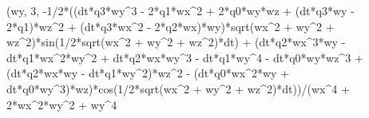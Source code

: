\documentclass[]{article}
\newenvironment{Shaded}{}{}
\newcommand{\DecValTok}[1]{\textcolor[rgb]{0.25,0.63,0.44}{#1}}
\newcommand{\OperatorTok}[1]{\textcolor[rgb]{0.40,0.40,0.40}{#1}}
\newcommand{\NormalTok}[1]{#1}
\begin{document}
\begin{Shaded}
\begin{Highlighting}[]
\NormalTok{(wy, }\DecValTok{3}\NormalTok{, }\OperatorTok{-}\DecValTok{1}\OperatorTok{/}\DecValTok{2}\OperatorTok{*}\NormalTok{((dt}\OperatorTok{*}\NormalTok{q3}\OperatorTok{*}\NormalTok{wy}\OperatorTok{^}\DecValTok{3} \OperatorTok{-} \DecValTok{2}\OperatorTok{*}\NormalTok{q1}\OperatorTok{*}\NormalTok{wx}\OperatorTok{^}\DecValTok{2} \OperatorTok{+} \DecValTok{2}\OperatorTok{*}\NormalTok{q0}\OperatorTok{*}\NormalTok{wy}\OperatorTok{*}\NormalTok{wz }\OperatorTok{+}\NormalTok{ (dt}\OperatorTok{*}\NormalTok{q3}\OperatorTok{*}\NormalTok{wy }\OperatorTok{-} \DecValTok{2}\OperatorTok{*}\NormalTok{q1)}\OperatorTok{*}\NormalTok{wz}\OperatorTok{^}\DecValTok{2} \OperatorTok{+}\NormalTok{ (dt}\OperatorTok{*}\NormalTok{q3}\OperatorTok{*}\NormalTok{wx}\OperatorTok{^}\DecValTok{2} \OperatorTok{-} \DecValTok{2}\OperatorTok{*}\NormalTok{q2}\OperatorTok{*}\NormalTok{wx)}\OperatorTok{*}\NormalTok{wy)}\OperatorTok{*}\NormalTok{sqrt(wx}\OperatorTok{^}\DecValTok{2} \OperatorTok{+}\NormalTok{ wy}\OperatorTok{^}\DecValTok{2} \OperatorTok{+}\NormalTok{ wz}\OperatorTok{^}\DecValTok{2}\NormalTok{)}\OperatorTok{*}\NormalTok{sin(}\DecValTok{1}\OperatorTok{/}\DecValTok{2}\OperatorTok{*}\NormalTok{sqrt(wx}\OperatorTok{^}\DecValTok{2} \OperatorTok{+}\NormalTok{ wy}\OperatorTok{^}\DecValTok{2} \OperatorTok{+}\NormalTok{ wz}\OperatorTok{^}\DecValTok{2}\NormalTok{)}\OperatorTok{*}\NormalTok{dt) }\OperatorTok{+}\NormalTok{ (dt}\OperatorTok{*}\NormalTok{q2}\OperatorTok{*}\NormalTok{wx}\OperatorTok{^}\DecValTok{3}\OperatorTok{*}\NormalTok{wy }\OperatorTok{-}\NormalTok{ dt}\OperatorTok{*}\NormalTok{q1}\OperatorTok{*}\NormalTok{wx}\OperatorTok{^}\DecValTok{2}\OperatorTok{*}\NormalTok{wy}\OperatorTok{^}\DecValTok{2} \OperatorTok{+}\NormalTok{ dt}\OperatorTok{*}\NormalTok{q2}\OperatorTok{*}\NormalTok{wx}\OperatorTok{*}\NormalTok{wy}\OperatorTok{^}\DecValTok{3} \OperatorTok{-}\NormalTok{ dt}\OperatorTok{*}\NormalTok{q1}\OperatorTok{*}\NormalTok{wy}\OperatorTok{^}\DecValTok{4} \OperatorTok{-}\NormalTok{ dt}\OperatorTok{*}\NormalTok{q0}\OperatorTok{*}\NormalTok{wy}\OperatorTok{*}\NormalTok{wz}\OperatorTok{^}\DecValTok{3} \OperatorTok{+}\NormalTok{ (dt}\OperatorTok{*}\NormalTok{q2}\OperatorTok{*}\NormalTok{wx}\OperatorTok{*}\NormalTok{wy }\OperatorTok{-}\NormalTok{ dt}\OperatorTok{*}\NormalTok{q1}\OperatorTok{*}\NormalTok{wy}\OperatorTok{^}\DecValTok{2}\NormalTok{)}\OperatorTok{*}\NormalTok{wz}\OperatorTok{^}\DecValTok{2} \OperatorTok{-}\NormalTok{ (dt}\OperatorTok{*}\NormalTok{q0}\OperatorTok{*}\NormalTok{wx}\OperatorTok{^}\DecValTok{2}\OperatorTok{*}\NormalTok{wy }\OperatorTok{+}\NormalTok{ dt}\OperatorTok{*}\NormalTok{q0}\OperatorTok{*}\NormalTok{wy}\OperatorTok{^}\DecValTok{3}\NormalTok{)}\OperatorTok{*}\NormalTok{wz)}\OperatorTok{*}\NormalTok{cos(}\DecValTok{1}\OperatorTok{/}\DecValTok{2}\OperatorTok{*}\NormalTok{sqrt(wx}\OperatorTok{^}\DecValTok{2} \OperatorTok{+}\NormalTok{ wy}\OperatorTok{^}\DecValTok{2} \OperatorTok{+}\NormalTok{ wz}\OperatorTok{^}\DecValTok{2}\NormalTok{)}\OperatorTok{*}\NormalTok{dt))}\OperatorTok{/}\NormalTok{(wx}\OperatorTok{^}\DecValTok{4} \OperatorTok{+} \DecValTok{2}\OperatorTok{*}\NormalTok{wx}\OperatorTok{^}\DecValTok{2}\OperatorTok{*}\NormalTok{wy}\OperatorTok{^}\DecValTok{2} \OperatorTok{+}\NormalTok{ wy}\OperatorTok{^}\DecValTok{4} 
\end{Highlighting}
\end{Shaded}
\end{document}
